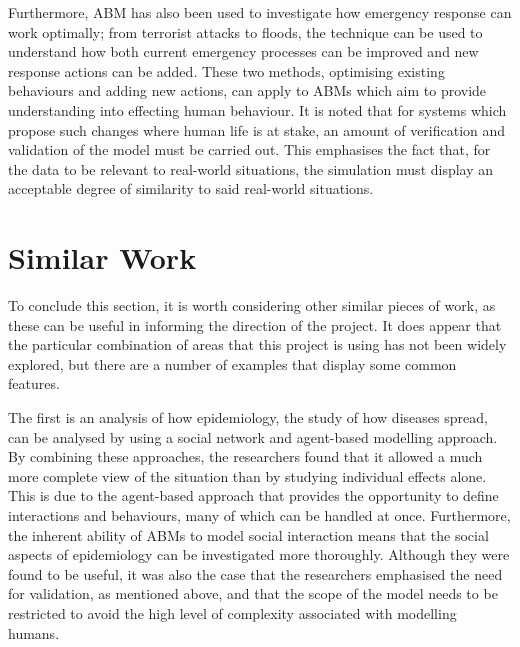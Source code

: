 \documentclass[]{report}
\begin{document}
Furthermore, ABM has also been used to investigate how emergency response can work optimally; from terrorist attacks to floods, the technique can be used to understand how both current emergency processes can be improved and new response actions can be added\cite{emergency}. These two methods, optimising existing behaviours and adding new actions, can apply to ABMs which aim to provide understanding into effecting human behaviour. It is noted that for systems which propose such changes where human life is at stake, an amount of verification and validation of the model must be carried out. This emphasises the fact that, for the data to be relevant to real-world situations, the simulation must display an acceptable degree of similarity to said real-world situations.

\section{Similar Work}

To conclude this section, it is worth considering other similar pieces of work, as these can be useful in informing the direction of the project. It does appear that the particular combination of areas that this project is using has not been widely explored, but there are a number of examples that display some common features.

The first is an analysis of how epidemiology, the study of how diseases spread, can be analysed by using a social network and agent-based modelling approach\cite{epid}. By combining these approaches, the researchers found that it allowed a much more complete view of the situation than by studying individual effects alone. This is due to the agent-based approach that provides the opportunity to define interactions and behaviours, many of which can be handled at once. Furthermore, the inherent ability of ABMs to model social interaction means that the social aspects of epidemiology can be investigated more thoroughly. Although they were found to be useful, it was also the case that the researchers emphasised the need for validation, as mentioned above, and that the scope of the model needs to be restricted to avoid the high level of complexity associated with modelling humans.
\end{document}
